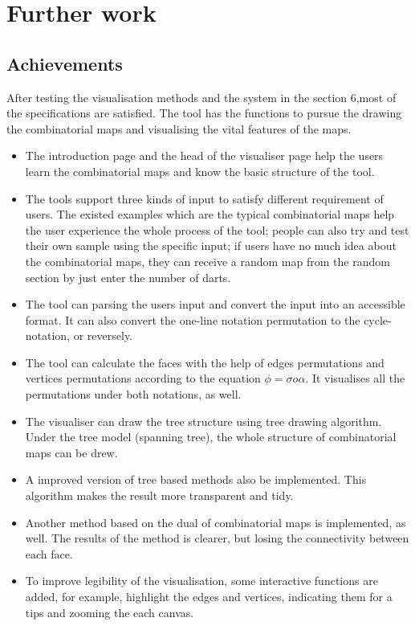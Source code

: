 
\chapter{Further work}

\section{Achievements}

After testing the visualisation methods and the system in the section 6,most of the specifications are satisfied. The tool has the functions to pursue the drawing the combinatorial maps and visualising the vital features of the maps.
\begin{itemize}
    \item The introduction page and the head of the visualiser page help the users learn the combinatorial maps and know the basic structure of the tool.
    \item The tools support three kinds of input to satisfy different requirement of users. The existed examples which are the typical combinatorial maps help the user experience the whole process of the tool; people can also try and test their own sample using the specific input; if users have no much idea about the combinatorial maps, they can receive a random map from the random section by just enter the number of darts.
    \item The tool can parsing the users input and convert the input into an accessible format. It can also convert the one-line notation permutation to the cycle-notation, or reversely.
    \item The tool can calculate the faces with the help of edges permutations and vertices permutations according to the equation \(\phi=\sigma o \alpha\). It visualises all the permutations under both notations, as well.
    \item The visualiser can draw the tree structure using tree drawing algorithm. Under the tree model (spanning tree), the whole structure of combinatorial maps can be drew.
    \item A improved version of tree based methods also be implemented. This algorithm makes the result more transparent and tidy.
    \item Another method based on the dual of combinatorial maps is implemented, as well. The results of the method is clearer, but losing the connectivity between each face.
    \item To improve legibility of the visualisation, some interactive functions are added, for example, highlight the edges and vertices, indicating them for a tips and zooming the each canvas.
\end{itemize}

